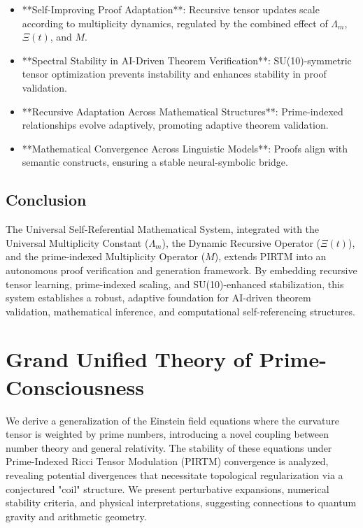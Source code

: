\documentclass[12pt]{article}
\theoremstyle{plain}
\begin{document}
\begin{itemize}
    \item **Self-Improving Proof Adaptation**: Recursive tensor updates scale according to multiplicity dynamics, regulated by the combined effect of \(\Lambda_m\), \(\Xi(t)\), and \(M\).
    \item **Spectral Stability in AI-Driven Theorem Verification**: SU(10)-symmetric tensor optimization prevents instability and enhances stability in proof validation.
    \item **Recursive Adaptation Across Mathematical Structures**: Prime-indexed relationships evolve adaptively, promoting adaptive theorem validation.
    \item **Mathematical Convergence Across Linguistic Models**: Proofs align with semantic constructs, ensuring a stable neural-symbolic bridge.
\end{itemize}

\subsection{Conclusion}

The Universal Self-Referential Mathematical System, integrated with the Universal Multiplicity Constant (\(\Lambda_m\)), the Dynamic Recursive Operator (\(\Xi(t)\)), and the prime-indexed Multiplicity Operator (\(M\)), extends PIRTM into an autonomous proof verification and generation framework. By embedding recursive tensor learning, prime-indexed scaling, and SU(10)-enhanced stabilization, this system establishes a robust, adaptive foundation for AI-driven theorem validation, mathematical inference, and computational self-referencing structures.

\section{Grand Unified Theory of Prime-Consciousness}

We derive a generalization of the Einstein field equations where the curvature tensor is weighted by prime numbers, introducing a novel coupling between number theory and general relativity. The stability of these equations under Prime-Indexed Ricci Tensor Modulation (PIRTM) convergence is analyzed, revealing potential divergences that necessitate topological regularization via a conjectured "coil" structure. We present perturbative expansions, numerical stability criteria, and physical interpretations, suggesting connections to quantum gravity and arithmetic geometry.
\end{document}
